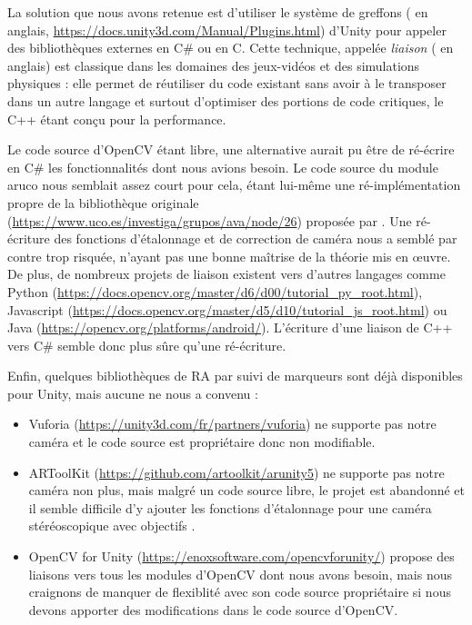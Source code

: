 La solution que nous avons retenue est d'utiliser le système de greffons ( en anglais, \url{https://docs.unity3d.com/Manual/Plugins.html}) d'Unity pour appeler des bibliothèques externes en C\# ou en C. Cette technique, appelée \emph{liaison} ( en anglais) est classique dans les domaines des jeux-vidéos et des simulations physiques : elle permet de réutiliser du code existant sans avoir à le transposer dans un autre langage et surtout d'optimiser des portions de code critiques, le C++ étant conçu pour la performance.

Le code source d'OpenCV étant libre, une alternative aurait pu être de ré-écrire en C\# les fonctionnalités dont nous avions besoin. Le code source du module aruco nous semblait assez court pour cela, étant lui-même une ré-implémentation propre de la bibliothèque originale (\url{https://www.uco.es/investiga/grupos/ava/node/26}) proposée par \cite{Garrido-Jurado2014}. Une ré-écriture des fonctions d'étalonnage et de correction de caméra nous a semblé par contre trop risquée, n'ayant pas une bonne maîtrise de la théorie mis en \oe uvre. De plus, de nombreux projets de liaison existent vers d'autres langages comme Python (\url{https://docs.opencv.org/master/d6/d00/tutorial_py_root.html}), Javascript (\url{https://docs.opencv.org/master/d5/d10/tutorial_js_root.html}) ou Java (\url{https://opencv.org/platforms/android/}). L'écriture d'une liaison de C++ vers C\# semble donc plus sûre qu'une ré-écriture.

Enfin, quelques bibliothèques de RA par suivi de marqueurs sont déjà disponibles pour Unity, mais aucune ne nous a convenu :
\begin{itemize}
  \item Vuforia (\url{https://unity3d.com/fr/partners/vuforia}) ne supporte pas notre caméra et le code source est propriétaire donc non modifiable.
  \item ARToolKit (\url{https://github.com/artoolkit/arunity5}) ne supporte pas notre caméra non plus, mais malgré un code source libre, le projet est abandonné et il semble difficile d'y ajouter les fonctions d'étalonnage pour une caméra stéréoscopique avec objectifs .
  \item OpenCV for Unity (\url{https://enoxsoftware.com/opencvforunity/}) propose des liaisons vers tous les modules d'OpenCV dont nous avons besoin, mais nous craignons de manquer de flexiblité avec son code source propriétaire si nous devons apporter des modifications dans le code source d'OpenCV.
\end{itemize}

